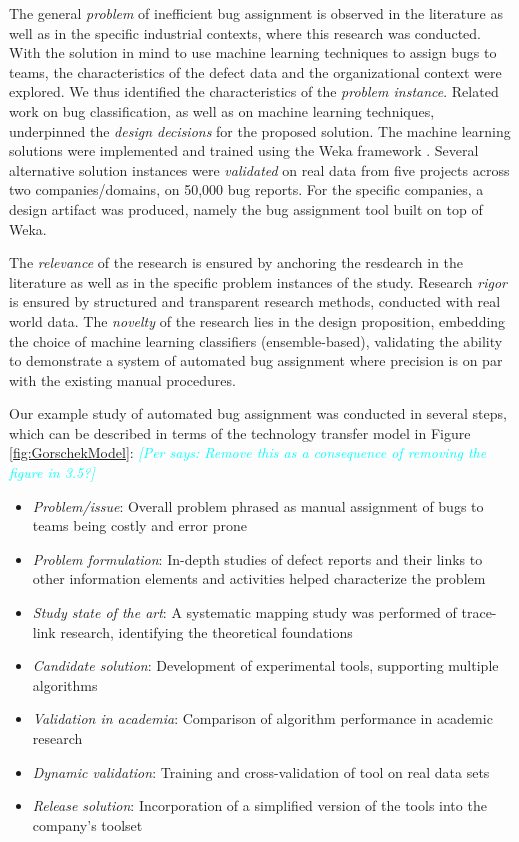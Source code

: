 \documentclass[graybox]{svmult}
\newcommand{\per}[1]{\textcolor{cyan}{{\it [Per says: #1]}}}
\newcommand{\per}[1]{}
\begin{document}
The general \emph{problem} of inefficient bug assignment is observed in the literature as well as in the specific industrial contexts, where this research was conducted. With the solution in mind to use machine learning techniques to assign bugs to teams, the characteristics of the defect data and the organizational context were explored. We thus identified the characteristics of the \emph{problem instance}. Related work on bug classification, as well as on machine learning techniques, underpinned the \emph{design decisions} for the proposed solution. The machine learning solutions were implemented  and trained using the Weka framework \cite{hall_weka_2009}. Several alternative solution instances were \emph{validated} on real data from five projects across two companies/domains, on 50,000 bug reports. For the specific companies, a design artifact was produced, namely the bug assignment tool built on top of Weka.

The \emph{relevance} of the research is ensured by anchoring the resdearch in the literature as well as in the specific problem instances of the study. Research \emph{rigor} is ensured by structured and transparent research methods, conducted with real world data. The \emph{novelty} of the research lies in the design proposition, embedding the choice of machine learning classifiers (ensemble-based), validating the ability to demonstrate a system of automated bug assignment where precision is on par with the existing manual procedures.

Our example study of automated bug assignment was conducted in several steps, which can be described in terms of the technology transfer model in Figure \ref{fig:GorschekModel}: \per{Remove this as a consequence of removing the figure in 3.5?}
\begin{itemize}
\item \emph{Problem/issue}: Overall problem phrased as manual assignment of bugs to teams being costly and error prone
\item \emph{Problem formulation}: In-depth studies of defect reports and their links to other information elements and activities helped characterize the problem
\item \emph{Study state of the art}: A systematic mapping study was performed of trace-link research, identifying the theoretical foundations \cite{Borg2013EMSE}
\item \emph{Candidate solution}: Development of experimental tools, supporting multiple algorithms
\item \emph{Validation in academia}: Comparison of algorithm performance in academic research \cite{BorgESEM13}
\item \emph{Dynamic validation}: Training and cross-validation of tool on real data sets \cite{JonssonBug15}
\item \emph{Release solution}: Incorporation of a simplified version of the tools into the company's toolset
\end{itemize} 
\end{document}
